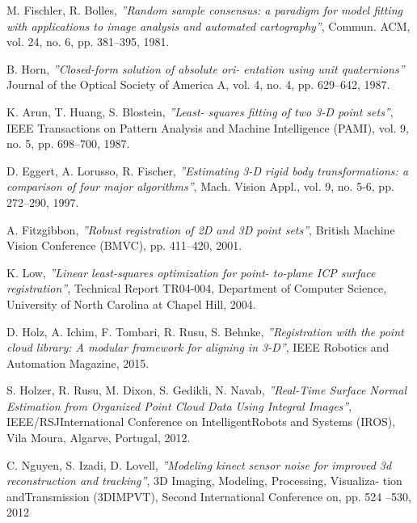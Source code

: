 \begin{thebibliography}{9}
    M. Fischler, R. Bolles,
    \textit{''Random sample consensus: a paradigm for model fitting with applications to image analysis and automated cartography''},
    Commun. ACM, vol. 24, no. 6, pp. 381–395,
    1981.
    
    B. Horn,
    \textit{''Closed-form solution of absolute ori- entation using unit quaternions''}
    Journal of the Optical Society of America A, vol. 4, no. 4, pp. 629–642,
    1987.
    
    K. Arun, T. Huang, S. Blostein,
    \textit{''Least- squares fitting of two 3-D point sets''},
    IEEE Transactions on Pattern Analysis and Machine Intelligence (PAMI), vol. 9, no. 5, pp. 698–700,
    1987.
    
    D. Eggert, A. Lorusso, R. Fischer,
    \textit{''Estimating 3-D rigid body transformations: a comparison of four major algorithms''},
    Mach. Vision Appl., vol. 9, no. 5-6, pp. 272–290,
    1997.
    
    A. Fitzgibbon,
    \textit{''Robust registration of 2D and 3D point sets''},
    British Machine Vision Conference (BMVC), pp. 411–420,
    2001.
    
    K. Low,
    \textit{''Linear least-squares optimization for point- to-plane ICP surface registration''},
    Technical Report TR04-004, Department of Computer Science, University of North Carolina at Chapel Hill,
    2004.
    
    D. Holz, A. Ichim, F. Tombari, R. Rusu, S. Behnke,
    \textit{''Registration with the point cloud library: A modular framework for aligning in 3-D''},
    IEEE Robotics and Automation Magazine,
    2015.
    
    S. Holzer, R. Rusu, M. Dixon, S. Gedikli, N. Navab,
    \textit{''Real-Time Surface Normal Estimation from Organized Point Cloud Data Using Integral Images''},
    IEEE/RSJInternational Conference on IntelligentRobots and Systems (IROS), Vila Moura, Algarve, Portugal,
    2012.

    C. Nguyen, S. Izadi, D. Lovell,
    \textit{''Modeling kinect sensor noise for improved 3d reconstruction and tracking''},
    3D Imaging, Modeling, Processing, Visualiza- tion andTransmission (3DIMPVT), Second International Conference on, pp. 524 –530,
    2012
\end{thebibliography}

